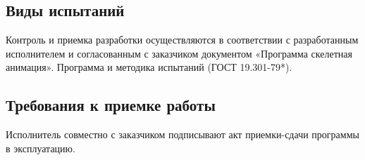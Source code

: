 \subsection{Виды испытаний}
Контроль и приемка разработки осуществляются в соответствии с разработанным исполнителем и согласованным с заказчиком документом «Программа скелетная анимация». Программа и методика испытаний (ГОСТ 19.301-79*).

\subsection{Требования к приемке работы}
Исполнитель совместно с заказчиком подписывают акт приемки-сдачи программы в эксплуатацию.